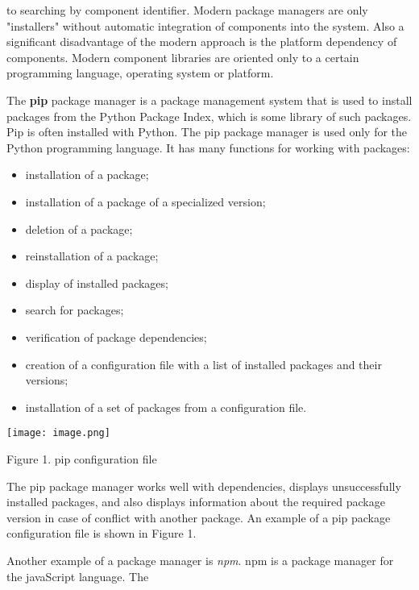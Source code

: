 \documentclass{article}
\begin{document}
\begin{multicols}{2}
to searching by component identifier. Modern package
managers are only "installers" without automatic integration of components into the system. Also a significant
disadvantage of the modern approach is the platform
dependency of components. Modern component libraries
are oriented only to a certain programming language,
operating system or platform.\par
The \textbf{pip} package manager is a package management
system that is used to install packages from the Python
Package Index, which is some library of such packages.
Pip is often installed with Python. The pip package manager is used only for the Python programming language.
It has many functions for working with packages:
\begin{itemize}[noitemsep]
\item installation of a package;
\item installation of a package of a specialized version;
\item deletion of a package;
\item reinstallation of a package;
\item display of installed packages;
\item search for packages;
\item verification of package dependencies;
\item creation of a configuration file with a list of installed
packages and their versions;
\item installation of a set of packages from a configuration
file.

\end{itemize}
\texttt{[image: image.png]}
\begin{center}
    Figure 1. pip configuration file
\end{center}
\hspace*{2em}The pip package manager works well with dependencies, displays unsuccessfully installed packages, and also
displays information about the required package version
in case of conflict with another package. An example of
a pip package configuration file is shown in Figure 1.\par
Another example of a package manager is \textit{npm}. npm
is a package manager for the javaScript language. The
\end{multicols}
\end{document}
